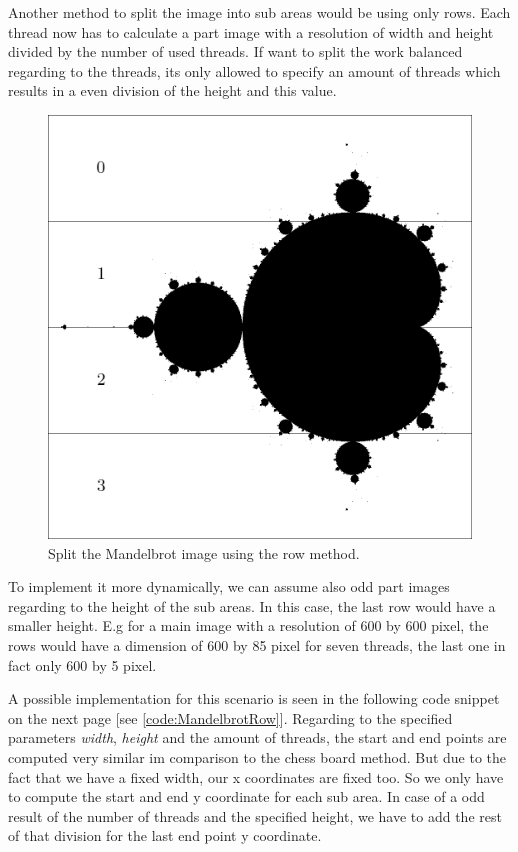 \newpage

\noindent Another method to split the image into sub areas would be using only rows. Each thread now has to calculate a part image with a resolution of width and height divided by the number of used threads. If want to split the work balanced regarding to the threads, its only allowed to specify an amount of threads which results in a even division of the height and this value. 

\begin{figure}[htbp]
	\centerline{\includegraphics[width=0.75\linewidth]{images/mandelbrot-row.png}}
	\caption{ Split the Mandelbrot image using the row method. }
	\label{fig:mandelbrotRows}
\end{figure} 

To implement it more dynamically, we can assume also odd part images regarding to the height of the sub areas.
In this case, the last row would have a smaller height. E.g for a main image with a resolution of 600 by 600 pixel, the rows would have a dimension of 600 by 85 pixel for seven threads, the last one in fact only 600 by 5 pixel. 

A possible implementation for this scenario is seen in the following code snippet on the next page [see \ref{code:MandelbrotRow}]. Regarding to the specified parameters \textit{width}, \textit{height} and the amount of threads, the start and end points are computed very similar im comparison to the chess board method. But due to the fact that we have a fixed width, our x coordinates are fixed too. So we only have to compute the start and end y coordinate for each sub area. In case of a odd result of the number of threads and the specified height, we have to add the rest of that division for the last end point y coordinate.

